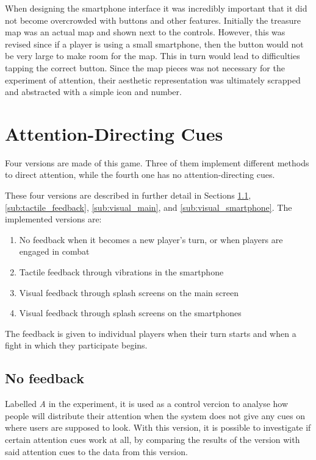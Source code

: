 When designing the smartphone interface it was incredibly important that it did not become overcrowded with buttons and other features. Initially the treasure map was an actual map and shown next to the controls. However, this was revised since if a player is using a small smartphone, then the button would not be very large to make room for the map. This in turn would lead to difficulties tapping the correct button. Since the map pieces was not necessary for the experiment of attention, their aesthetic representation was ultimately scrapped and abstracted with a simple icon and number.

\section{Attention-Directing Cues}
Four versions are made of this game. Three of them implement different methods to direct attention, while the fourth one has no attention-directing cues. 

These four versions are described in further detail in Sections \ref{sub:no_feedback}, \ref{sub:tactile_feedback}, \ref{sub:visual_main}, and \ref{sub:visual_smartphone}. The implemented versions are:

\begin{enumerate}[label=\Alph*)]
\item No feedback when it becomes a new player's turn, or when players are engaged in combat
\item Tactile feedback through vibrations in the smartphone
\item Visual feedback through splash screens on the main screen
\item Visual feedback through splash screens on the smartphones
\end{enumerate}

The feedback is given to individual players when their turn starts and when a fight in which they participate begins.

\subsection{No feedback}\label{sub:no_feedback}
Labelled \textit{A} in the experiment, it is used as a control vercion to analyse how people will distribute their attention when the system does not give any cues on where users are supposed to look. With this version, it is possible to investigate if certain attention cues work at all, by comparing the results of the version with said attention cues to the data from this version.

